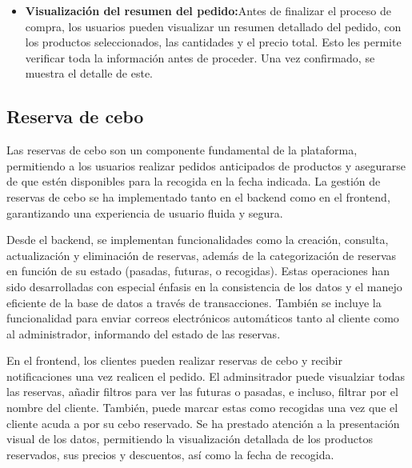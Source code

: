 \begin{itemize}
    \begin{itemize}

        \item \textbf{Visualización del resumen del pedido:}Antes de finalizar el proceso de compra, los usuarios pueden visualizar un resumen detallado del pedido, con los productos seleccionados, las cantidades y el precio total. Esto les permite verificar toda la información antes de proceder. Una vez confirmado, se muestra el detalle de este.

    \end{itemize}

\end{itemize}

\subsection{Reserva de cebo}\label{subsec5.4.4}

Las reservas de cebo son un componente fundamental de la plataforma, permitiendo a los usuarios realizar pedidos anticipados de productos y asegurarse de que estén disponibles para la recogida en la fecha indicada. La gestión de reservas de cebo se ha implementado tanto en el backend como en el frontend, garantizando una experiencia de usuario fluida y segura.

\vspace{0.5cm}
Desde el backend, se implementan funcionalidades como la creación, consulta, actualización y eliminación de reservas, además de la categorización de reservas en función de su estado (pasadas, futuras, o recogidas). Estas operaciones han sido desarrolladas con especial énfasis en la consistencia de los datos y el manejo eficiente de la base de datos a través de transacciones. También se incluye la funcionalidad para enviar correos electrónicos automáticos tanto al cliente como al administrador, informando del estado de las reservas.

\vspace{0.5cm}

En el frontend, los clientes pueden realizar reservas de cebo y recibir notificaciones una vez realicen el pedido. El adminsitrador puede visualziar todas las reservas, añadir filtros para ver las futuras o pasadas, e incluso, filtrar por el nombre del cliente. También, puede marcar estas como recogidas una vez que el cliente acuda a por su cebo reservado.
Se ha prestado atención a la presentación visual de los datos, permitiendo la visualización detallada de los productos reservados, sus precios y descuentos, así como la fecha de recogida.

